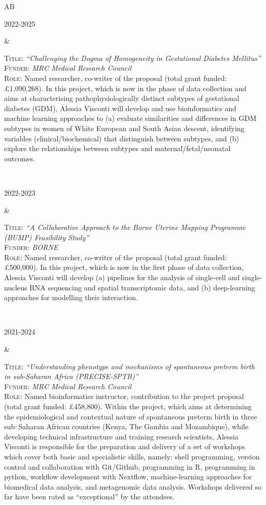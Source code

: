 \documentclass[a4paper,10pt]{article}
\newenvironment{doubletablelist}
{
	\vspace{-0.2cm}
	\begin{longtable}[!h]{AB}}{\end{longtable}
}
\newcommand{\dtlist}[2]{
\hspace{-3cm}
\noindent
	\begin{minipage}{0.22\textwidth}
	\begin{flushright}
	\textsc{#1}
	\end{flushright}
	\end{minipage}
	& #2\\[0.2cm]
}
\begin{document}
\begin{doubletablelist}
    \dtlist{2022-2025}{\begin{minipage}[t]{0.65\textwidth}
		\textsc{Title:} \emph{``Challenging the Dogma of Homogeneity in Gestational Diabetes Mellitus''}\\
		\textsc{Funder:} \emph{MRC Medical Research Council}\\
		\textsc{Role:} Named researcher, co-writer of the proposal (total grant funded: £1,090,268). In this project, which is now in the phase of data collection and aims at characterising pathophysiologically distinct subtypes of gestational diabetes (GDM), Alessia Visconti will develop and use bioinformatics and machine learning approaches to (a) evaluate similarities and differences in GDM subtypes in women of White European and South Asian descent, identifying variables (clinical/biochemical) that distinguish between subtypes, and (b) explore the relationships between subtypes and maternal/fetal/neonatal outcomes.
	\end{minipage}}
	 
	\dtlist{2022-2023}{\begin{minipage}[t]{0.65\textwidth}
		\textsc{Title:} \emph{``A Collaborative Approach to the Borne Uterine Mapping Programme (BUMP) Feasibility Study''}\\
		\textsc{Funder:} \emph{BORNE}\\
		\textsc{Role:} Named researcher, co-writer of the proposal (total grant funded: £500,000). In this project, which is now in the first phase of data collection, Alessia Visconti will develop (a) pipelines for the analysis of single-cell and single-nucleus RNA sequencing and spatial transcriptomic data, and (b) deep-learning approaches for modelling their interaction. 
	\end{minipage}} 

	\dtlist{2021-2024}{  \begin{minipage}[t]{0.65\textwidth}
		\textsc{Title:} \emph{``Understanding phenotype and mechanisms of spontaneous preterm birth in sub-Saharan Africa (PRECISE-SPTB)''}\\
		\textsc{Funder:} \emph{MRC Medical Research Council}\\
		\textsc{Role:} Named bioinformatics instructor,  contribution to the project proposal (total grant funded: £458,800).  Within the project, which aims at determining the epidemiological and contextual nature of spontaneous preterm birth in three sub–Saharan African countries (Kenya, The Gambia and Mozambique), while developing technical infrastructure and training research scientists, Alessia Visconti is responsible for the preparation and delivery of a set of workshops which cover both basic and specialistic skills, namely: shell programming, version control and collaboration with Git/Github, programming in R, programming in python, workflow development with Nextflow, machine-learning approaches for biomedical data analysis, and metagenomic data analysis. Workshops delivered so far have been rated as “exceptional” by the attendees.
	\end{minipage}}
	

\end{doubletablelist}
\end{document}
